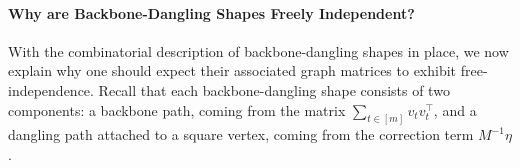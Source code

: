\documentclass[12pt]{article}
\def \E {\mathbb{E}}
\begin{document}

\paragraph{Why are Backbone-Dangling Shapes Freely Independent?}

With the combinatorial description of backbone-dangling shapes in place, we now
explain why one should expect their associated graph matrices to exhibit
free-independence. Recall that each backbone-dangling shape consists of
two components: a backbone path, coming from the matrix
\(\sum_{t\in[m]} v_tv_t^\top\), and a dangling path attached to a square vertex,
coming from the correction term \(M^{-1}\eta\).
\end{document}
